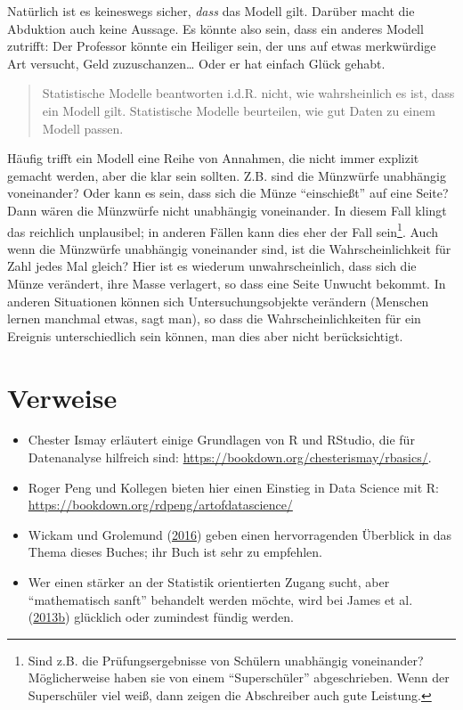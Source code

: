 \documentclass[12pt,]{book}
\let\rmarkdownfootnote\footnote%
\def\footnote{\protect\rmarkdownfootnote}
\begin{document}
Natürlich ist es keineswegs sicher, \emph{dass} das Modell gilt. Darüber
macht die Abduktion auch keine Aussage. Es könnte also sein, dass ein
anderes Modell zutrifft: Der Professor könnte ein Heiliger sein, der uns
auf etwas merkwürdige Art versucht, Geld zuzuschanzen\ldots{} Oder er
hat einfach Glück gehabt.

\begin{quote}
Statistische Modelle beantworten i.d.R. nicht, wie wahrsheinlich es ist,
dass ein Modell gilt. Statistische Modelle beurteilen, wie gut Daten zu
einem Modell passen.
\end{quote}

Häufig trifft ein Modell eine Reihe von Annahmen, die nicht immer
explizit gemacht werden, aber die klar sein sollten. Z.B. sind die
Münzwürfe unabhängig voneinander? Oder kann es sein, dass sich die Münze
``einschießt'' auf eine Seite? Dann wären die Münzwürfe nicht unabhängig
voneinander. In diesem Fall klingt das reichlich unplausibel; in anderen
Fällen kann dies eher der Fall sein\footnote{Sind z.B. die
  Prüfungsergebnisse von Schülern unabhängig voneinander? Möglicherweise
  haben sie von einem ``Superschüler'' abgeschrieben. Wenn der
  Superschüler viel weiß, dann zeigen die Abschreiber auch gute
  Leistung.}. Auch wenn die Münzwürfe unabhängig voneinander sind, ist
die Wahrscheinlichkeit für Zahl jedes Mal gleich? Hier ist es wiederum
unwahrscheinlich, dass sich die Münze verändert, ihre Masse verlagert,
so dass eine Seite Unwucht bekommt. In anderen Situationen können sich
Untersuchungsobjekte verändern (Menschen lernen manchmal etwas, sagt
man), so dass die Wahrscheinlichkeiten für ein Ereignis unterschiedlich
sein können, man dies aber nicht berücksichtigt.

\section{Verweise}\label{verweise}

\begin{itemize}
\item
  Chester Ismay erläutert einige Grundlagen von R und RStudio, die für
  Datenanalyse hilfreich sind:
  \url{https://bookdown.org/chesterismay/rbasics/}.
\item
  Roger Peng und Kollegen bieten hier einen Einstieg in Data Science mit
  R: \url{https://bookdown.org/rdpeng/artofdatascience/}
\item
  Wickam und Grolemund (\protect\hyperlink{ref-r4ds}{2016}) geben einen
  hervorragenden Überblick in das Thema dieses Buches; ihr Buch ist sehr
  zu empfehlen.
\item
  Wer einen stärker an der Statistik orientierten Zugang sucht, aber
  ``mathematisch sanft'' behandelt werden möchte, wird bei James et al.
  (\protect\hyperlink{ref-introstatlearning}{2013}\protect\hyperlink{ref-introstatlearning}{b})
  glücklich oder zumindest fündig werden.
\end{itemize}
\end{document}
